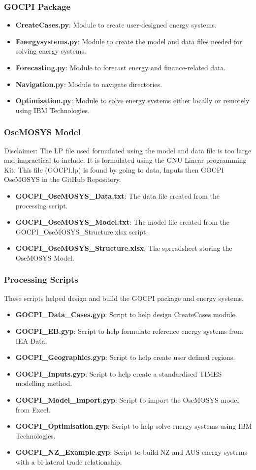 \documentclass[12pt]{article}
\begin{document}
\subsubsection{GOCPI Package}
\begin{itemize}
	\item \textbf{CreateCases.py}: Module to create user-designed energy systems.
	\item \textbf{Energysystems.py}: Module to create the model and data files needed for solving energy systems.
	\item \textbf{Forecasting.py}: Module to forecast energy and finance-related data.
	\item \textbf{Navigation.py}: Module to navigate directories.
	\item \textbf{Optimisation.py}: Module to solve energy systems either locally or remotely using IBM Technologies.
\end{itemize}
\subsubsection{OseMOSYS Model}
Disclaimer: The LP file used formulated using the model and data file is too large and impractical to include.
It is formulated using the GNU Linear programming Kit. 
This file (GOCPI.lp) is found by going to data, Inputs then GOCPI OseMOSYS in the GitHub Repository.
\begin{itemize}
	\item \textbf{GOCPI\_OseMOSYS\_Data.txt}: The data file created from the processing script.
	\item \textbf{GOCPI\_OseMOSYS\_Model.txt}: The model file created from the GOCPI\_OseMOSYS\_Structure.xlsx script.
	\item \textbf{GOCPI\_OseMOSYS\_Structure.xlsx}: The spreadsheet storing the OseMOSYS Model.
\end{itemize}
\subsubsection{Processing Scripts}
These scripts helped design and build the GOCPI package and energy systems.
\begin{itemize}
	\item \textbf{GOCPI\_Data\_Cases.gyp}: Script to help design CreateCases module.
	\item \textbf{GOCPI\_EB.gyp}: Script to help formulate reference energy systems from IEA Data.
	\item \textbf{GOCPI\_Geographies.gyp}: Script to help create user defined regions.
	\item \textbf{GOCPI\_Inputs.gyp}: Script to help create a standardised TIMES modelling method.
	\item \textbf{GOCPI\_Model\_Import.gyp}: Script to import the OseMOSYS model from Excel.
	\item \textbf{GOCPI\_Optimisation.gyp}: Script to help solve energy systems using IBM Technologies.
	\item \textbf{GOCPI\_NZ\_Example.gyp}: Script to build NZ and AUS energy systems with a bi-lateral trade relationship.
\end{itemize}
\end{document}
